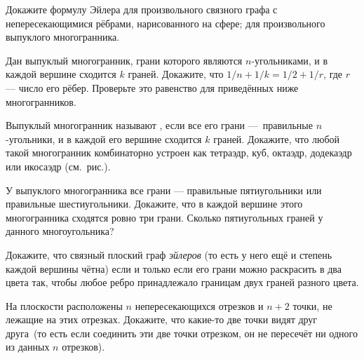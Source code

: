 \documentclass[12pt,a4paper]{article}
\begin{document}
 Докажите формулу Эйлера
 для произвольного
связного графа с непересекающимися р\"ебра\-ми,
нарисованного на сфере;
 для произвольного
выпуклого многогранника.

 Дан выпуклый многогранник, грани которого являются $n$-угольниками,
и в каж\-дой вершине сходится $k$ граней. Докажите, что
$1/n+1/k=1/2+1/r$, где $r$ --- число его р\"ебер.
 Проверьте это равенство для приведённых ниже многогранников.



\vspace*{.1truecm}






\vspace*{.2truecm}

Выпуклый многогранник называют , если
все его грани ---~\hbox{правильные} $n$-угольники, и
в каждой его вершине сходится $k$ граней. Докажите,
что любой такой многогранник комбинаторно устроен как
тетраэдр, куб, октаэдр, додекаэдр или икосаэдр (см.~рис.).

У выпуклого многогранника все грани — правильные пятиугольники или правильные шестиугольники.
 Докажите, что в каждой вершине этого многогранника сходятся ровно три грани.
 Сколько пятиугольных граней у данного многоугольника?

Докажите, что связный плоский граф {\em эйлеров} (то есть у него ещё и степень каждой вершины чётна)
если и только если его грани можно раскрасить в два цвета так,
чтобы любое ребро принадлежало границам двух граней разного цвета.

На плоскости расположены $n$ непересекающихся отрезков и $n+2$ точки,
не лежащие на этих отрезках. Докажите, что какие-то две точки  видят
друг друга\ (то есть если соединить эти две точки отрезком, он не пересечёт
ни одного из данных $n$ отрезков).



\end{document}
